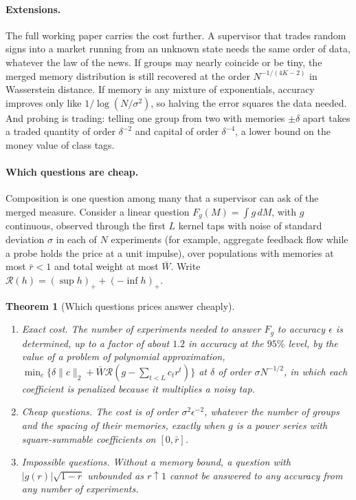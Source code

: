 \documentclass[12pt]{article}
\newtheorem{theorem}{Theorem}[section]
\theoremstyle{definition}
\theoremstyle{remark}
\begin{document}
\paragraph{Extensions.} The full working paper \citep{niroula2026full} carries the cost further. A supervisor that trades random signs into a market running from an unknown state needs the same order of data, whatever the law of the news. If groups may nearly coincide or be tiny, the merged memory distribution is still recovered at the order $N^{-1/(4K-2)}$ in Wasserstein distance. If memory is any mixture of exponentials, accuracy improves only like $1/\log(N/\sigma^2)$, so halving the error squares the data needed. And probing is trading: telling one group from two with memories $\pm\delta$ apart takes a traded quantity of order $\delta^{-2}$ and capital of order $\delta^{-4}$, a lower bound on the money value of class tags.

\paragraph{Which questions are cheap.} Composition is one question among many that a supervisor can ask of the merged measure. Consider a linear question $F_g(M)=\int g\,dM$, with $g$ continuous, observed through the first $L$ kernel taps with noise of standard deviation $\sigma$ in each of $N$ experiments (for example, aggregate feedback flow while a probe holds the price at a unit impulse), over populations with memories at most $\bar r<1$ and total weight at most $\bar W$. Write $\mathcal R(h)=(\sup h)_++(-\inf h)_+$.

\begin{theorem}[Which questions prices answer cheaply]\label{n:questions}
\begin{enumerate}[label=(\roman*),itemsep=1pt]
\item \emph{Exact cost.} The number of experiments needed to answer $F_g$ to accuracy $\epsilon$ is determined, up to a factor of about $1.2$ in accuracy at the $95\%$ level, by the value of a problem of polynomial approximation, $\min_c\{\delta\|c\|_2+\bar W\mathcal R(g-\sum_{t<L}c_tr^t)\}$ at $\delta$ of order $\sigma N^{-1/2}$, in which each coefficient is penalized because it multiplies a noisy tap.
\item \emph{Cheap questions.} The cost is of order $\sigma^2\epsilon^{-2}$, whatever the number of groups and the spacing of their memories, exactly when $g$ is a power series with square-summable coefficients on $[0,\bar r]$.
\item \emph{Impossible questions.} Without a memory bound, a question with $|g(r)|\sqrt{1-r}$ unbounded as $r\uparrow1$ cannot be answered to any accuracy from any number of experiments.
\end{enumerate}
\end{theorem}
\end{document}
